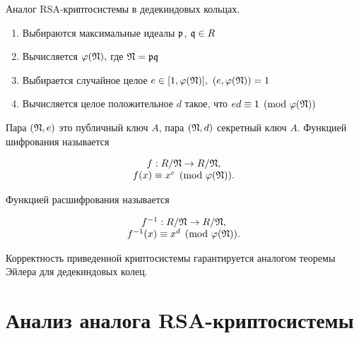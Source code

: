 \documentclass[_00_dissertation.tex]{subfiles}
\begin{document}
\begin{algorithm}\label{algorithm:RSA_in_dedekind}\cite{source:Petukhova}
    Аналог RSA-криптосистемы в дедекиндовых кольцах.

    \begin{enumerate}
        \item Выбираются максимальные идеалы $\mathfrak{p}$, $\mathfrak{q}\in R$

        \item Вычисляется $\varphi(\mathfrak{N}),$ где $\mathfrak{N} = \mathfrak{p} \mathfrak{q}$

        \item Выбирается случайное целое $e \in [1, \varphi(\mathfrak{N})],$ $(e, \varphi(\mathfrak{N}))=1$

        \item Вычисляется целое положительное $d$ такое, что $ed \equiv 1 \pmod{\varphi(\mathfrak{N})}$
    \end{enumerate}

    Пара $(\mathfrak{N}, e)$ это публичный ключ $A$, пара $(\mathfrak{N}, d)$ секретный ключ $A$.
    Функцией шифрования называется

    \begin{equation*}
        \begin{array}{c}
            f: R/\mathfrak{N} \to R/\mathfrak{N},\\
            f(x) \equiv x^{e} \pmod{\varphi(\mathfrak{N})}.
        \end{array}
    \end{equation*}

    Функцией расшифрования называется

    \begin{equation*}
        \begin{array}{c}
            f^{-1}: R/\mathfrak{N} \to R/\mathfrak{N},\\
            f^{-1}(x) \equiv x^{d}\pmod{\varphi(\mathfrak{N})}.
        \end{array}
    \end{equation*}
\end{algorithm}

\begin{remark}
    Корректность приведенной криптосистемы гарантируется аналогом теоремы Эйлера для дедекиндовых колец.
\end{remark}

\section{Анализ аналога RSA-криптосистемы}
\end{document}
